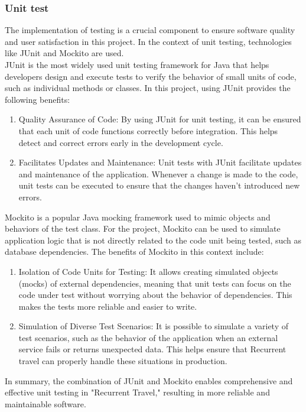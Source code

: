\documentclass[../memory.tex]{subfiles}
\begin{document}
\subsubsection{Unit test}
The implementation of testing is a crucial component to ensure software quality and user satisfaction in this project. In the context of unit testing, technologies like JUnit and Mockito are used.
\\[8pt]
JUnit is the most widely used unit testing framework for Java that helps developers design and execute tests to verify the behavior of small units of code, such as individual methods or classes. In this project, using JUnit provides the following benefits:
\begin{enumerate}[label = -]
	\item Quality Assurance of Code: By using JUnit for unit testing, it can be
	      ensured that each unit of code functions correctly before integration. This
	      helps detect and correct errors early in the development cycle.
	\item Facilitates Updates and Maintenance: Unit tests with JUnit facilitate
	      updates and maintenance of the application. Whenever a change is made to the
	      code, unit tests can be executed to ensure that the changes haven't
	      introduced new errors.
\end{enumerate}
Mockito is a popular Java mocking framework used to mimic objects and
behaviors of the test class. For the project, Mockito can be used to
simulate application logic that is not directly related to the code unit
being tested, such as database dependencies. The benefits of Mockito in this
context include:
\begin{enumerate}[label = -]
	\item Isolation of Code Units for Testing: It allows creating simulated
	      objects (mocks) of external dependencies, meaning that unit tests can focus
	      on the code under test without worrying about the behavior of dependencies.
	      This makes the tests more reliable and easier to write.
	\item Simulation of Diverse Test Scenarios: It is possible to simulate a
	      variety of test scenarios, such as the behavior of the application when an
	      external service fails or returns unexpected data. This helps ensure that
	      Recurrent travel can properly handle these situations in production.
\end{enumerate}
In summary, the combination of JUnit and Mockito enables comprehensive and
effective unit testing in "Recurrent Travel," resulting in more reliable and
maintainable software.
\end{document}

